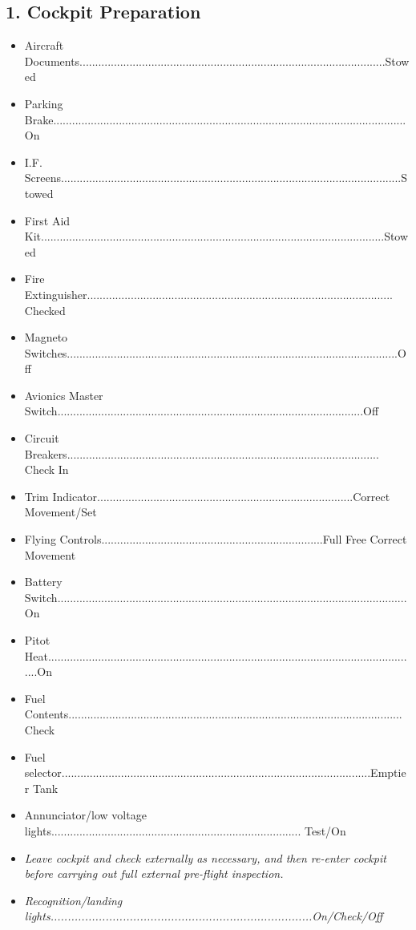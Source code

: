 \documentclass[a4paper]{article}
\newenvironment{checklist}{
  \begin{itemize}[leftmargin=*, align=left]
    \setlength{\itemsep}{2pt}
    \setlength{\parskip}{0pt}
    \setlength{\parsep}{0pt}
}{
  \end{itemize}
}
\begin{document}
\subsection*{1. Cockpit Preparation}
\begin{checklist}
\item Aircraft Documents..................................................................................................Stowed
\item Parking Brake.................................................................................................................On
\item I.F. Screens.............................................................................................................Stowed
\item First Aid Kit..............................................................................................................Stowed
\item Fire Extinguisher.................................................................................................. Checked
\item Magneto Switches..........................................................................................................Off
\item Avionics Master Switch..................................................................................................Off
\item Circuit Breakers.................................................................................................... Check In
\item Trim Indicator..................................................................................Correct Movement/Set
\item Flying Controls.......................................................................Full Free Correct Movement
\item Battery Switch................................................................................................................On
\item Pitot Heat.......................................................................................................................On
\item Fuel Contents........................................................................................................... Check
\item Fuel selector...................................................................................................Emptier Tank
\item Annunciator/low voltage lights................................................................................ Test/On
\item \textit{Leave cockpit and check externally as necessary, and then re-enter cockpit before carrying out full external pre-flight inspection.}
\item \textit{Recognition/landing lights............................................................................On/Check/Off}
\end{checklist}
\end{document}
